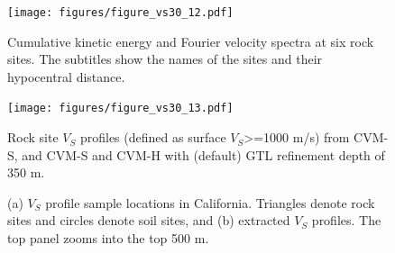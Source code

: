 \clearpage
\begin{figure}[!ht]
  \centering
  \texttt{[image: figures/figure\_vs30\_12.pdf]}
  \caption{Cumulative kinetic energy and Fourier velocity spectra at six rock sites. The subtitles show the names of the sites and their hypocentral distance.
  }
  \label{fig:vs30-12}
\end{figure}

\clearpage
\begin{figure}[!ht]
  \centering
  \texttt{[image: figures/figure\_vs30\_13.pdf]}
  \caption{Rock site $V_S$ profiles (defined as surface $V_S$>=1000 m/s) from CVM-S, and CVM-S and CVM-H with (default) \citet{elyVs30derivedNearsurfaceSeismic2010} GTL refinement depth of 350 m.}
  \label{fig:vs30-13}
\end{figure}

\clearpage
{}
\begin{figure}[!ht]
   \hfil
  \caption{ (a) $V_S$ profile sample locations in California. Triangles denote rock sites and circles denote soil sites, and (b) extracted $V_S$ profiles. The top panel zooms into the top 500 m. }
  \label{fig:vs30-14}
\end{figure}

